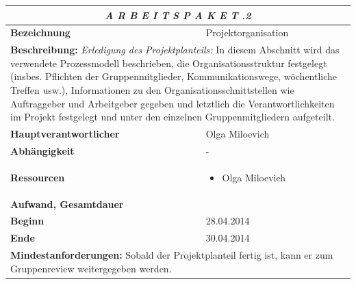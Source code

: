 \documentclass[fontsize=12pt,paper=a4,twoside]{scrartcl}
\begin{document}
\begin{tabular}{p{7.5cm}|p{7.5cm}}\toprule
\multicolumn{2}{c}{\textbf{\textit{A R B E I T S P A K E T \quad 1.1.2}}} \\ \toprule \hline
\textbf{Bezeichnung} & Projektorganisation\\\hline
\multicolumn{2}{p{15cm}}{\textbf{Beschreibung:} \newline 
\textit{Erledigung des Projektplanteils:} In diesem Abschnitt wird das verwendete Prozessmodell beschrieben, die Organisationsstruktur festgelegt (insbes. Pflichten der Gruppenmitglieder, Kommunikationswege, wöchentliche Treffen usw.), Informationen zu den Organisationsschnittstellen wie Auftraggeber und Arbeitgeber gegeben und letztlich die Verantwortlichkeiten im Projekt festgelegt und unter den einzelnen Gruppenmitgliedern aufgeteilt.    }  \\\hline
\textbf{Hauptverantwortlicher} & Olga Miloevich\\\hline
\textbf{Abhängigkeit} & -\\\hline
\textbf{Ressourcen} & \begin{itemize}
\itemsep0pt
\item Olga Miloevich
\end{itemize} \\\hline
\textbf{Aufwand, Gesamtdauer} & \\\hline
\textbf{Beginn} & 28.04.2014 \\\hline
\textbf{Ende} & 30.04.2014\\\hline
\multicolumn{2}{p{15cm}}{\textbf{Mindestanforderungen: } \newline
Sobald der Projektplanteil fertig ist, kann er zum Gruppenreview weitergegeben werden. }  \\ \toprule
\end{tabular} \\\\
\end{document}
